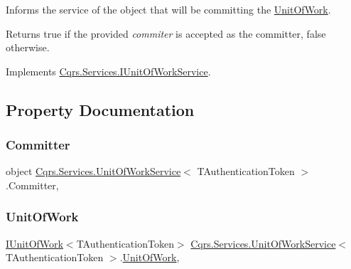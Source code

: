 Informs the service of the object that will be committing the \hyperlink{classCqrs_1_1Services_1_1UnitOfWorkService_a1ba76512e37e5006c2b65d071803e99f}{Unit\+Of\+Work}. 

\begin{DoxyReturn}{Returns}
true if the provided {\itshape commiter}  is accepted as the committer, false otherwise. 
\end{DoxyReturn}


Implements \hyperlink{interfaceCqrs_1_1Services_1_1IUnitOfWorkService_a54f241cd90bbebf9cc73d5a296ed593b}{Cqrs.\+Services.\+I\+Unit\+Of\+Work\+Service}.



\subsection{Property Documentation}
\mbox{\label{classCqrs_1_1Services_1_1UnitOfWorkService_aabeccb6ba949fe02b8676b324f85950b}} 
\subsubsection{\texorpdfstring{Committer}{Committer}}
{\footnotesize\ttfamily object \hyperlink{classCqrs_1_1Services_1_1UnitOfWorkService}{Cqrs.\+Services.\+Unit\+Of\+Work\+Service}$<$ T\+Authentication\+Token $>$.Committer\hspace{0.3cm}{\ttfamily [get]}, {\ttfamily [protected]}}

\mbox{\label{classCqrs_1_1Services_1_1UnitOfWorkService_a1ba76512e37e5006c2b65d071803e99f}} 
\subsubsection{\texorpdfstring{Unit\+Of\+Work}{UnitOfWork}}
{\footnotesize\ttfamily \hyperlink{interfaceCqrs_1_1Domain_1_1IUnitOfWork}{I\+Unit\+Of\+Work}$<$T\+Authentication\+Token$>$ \hyperlink{classCqrs_1_1Services_1_1UnitOfWorkService}{Cqrs.\+Services.\+Unit\+Of\+Work\+Service}$<$ T\+Authentication\+Token $>$.\hyperlink{classCqrs_1_1Domain_1_1UnitOfWork}{Unit\+Of\+Work}\hspace{0.3cm}{\ttfamily [get]}, {\ttfamily [protected]}}

